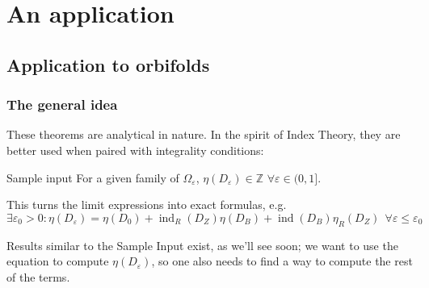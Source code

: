\documentclass{beamer}
\DeclareMathOperator{\ind}{ind}
\newcommand{\ve}{\varepsilon}
\newcommand{\bb}{\mathbb}
\begin{document}
\section{An application}
\subsection*{Application to orbifolds}
\begin{frame}
\frametitle{The general idea}

These theorems are analytical in nature. In the spirit of Index Theory, they are better used when paired with integrality conditions:

\begin{block}{Sample input}
For a given family of $\Omega_\ve$, $\eta(D_\ve)\in\bb Z$ $\forall \ve\in (0,1]$.
\end{block}

This turns the limit expressions into exact formulas, e.g.
\[
\exists\ve_0>0: \eta(D_\ve)=\eta(D_0)+\ind_R(D_Z)\eta(D_B)+\ind(D_B)\eta_R(D_Z)\ \ \forall\ve\leq\ve_0
\]

Results similar to the Sample Input exist, as we'll see soon; we want to use the equation to compute $\eta(D_\ve)$, so one also needs to find a way to compute the rest of the terms.

\end{frame}






\end{document}
